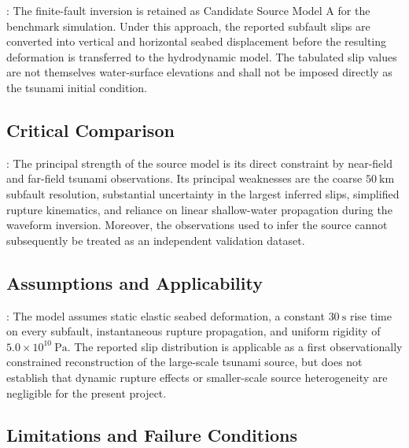 
\textcite{fujii2011tsunamisource}: The finite-fault inversion is retained as Candidate Source Model A for the benchmark simulation. Under this approach, the reported subfault slips are converted into vertical and horizontal seabed displacement before the resulting deformation is transferred to the hydrodynamic model. The tabulated slip values are not themselves water-surface elevations and shall not be imposed directly as the tsunami initial condition.

\subsection{Critical Comparison}
\label{sec:res-phy-src-critical-comparison}


\textcite{fujii2011tsunamisource}: The principal strength of the source model is its direct constraint by near-field and far-field tsunami observations. Its principal weaknesses are the coarse $50~\mathrm{km}$ subfault resolution, substantial uncertainty in the largest inferred slips, simplified rupture kinematics, and reliance on linear shallow-water propagation during the waveform inversion. Moreover, the observations used to infer the source cannot subsequently be treated as an independent validation dataset.

\subsection{Assumptions and Applicability}
\label{sec:res-phy-src-assumptions}


\textcite{fujii2011tsunamisource}: The model assumes static elastic seabed deformation, a constant $30~\mathrm{s}$ rise time on every subfault, instantaneous rupture propagation, and uniform rigidity of $5.0 \times 10^{10}~\mathrm{Pa}$. The reported slip distribution is applicable as a first observationally constrained reconstruction of the large-scale tsunami source, but does not establish that dynamic rupture effects or smaller-scale source heterogeneity are negligible for the present project.

\subsection{Limitations and Failure Conditions}
\label{sec:res-phy-src-limitations}

